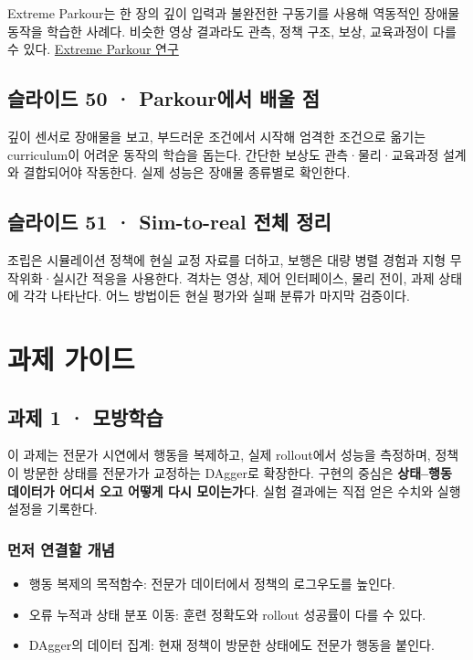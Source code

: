 \documentclass[11pt,a4paper]{article}
\begin{document}
Extreme Parkour는 한 장의 깊이 입력과 불완전한 구동기를 사용해 역동적인 장애물 동작을 학습한 사례다. 비슷한 영상 결과라도 관측, 정책 구조, 보상, 교육과정이 다를 수 있다. \href{https://arxiv.org/abs/2309.14341}{Extreme Parkour 연구}\par

\subsection{슬라이드 50 · Parkour에서 배울 점}

깊이 센서로 장애물을 보고, 부드러운 조건에서 시작해 엄격한 조건으로 옮기는 curriculum이 어려운 동작의 학습을 돕는다. 간단한 보상도 관측·물리·교육과정 설계와 결합되어야 작동한다. 실제 성능은 장애물 종류별로 확인한다.\par

\subsection{슬라이드 51 · Sim-to-real 전체 정리}

조립은 시뮬레이션 정책에 현실 교정 자료를 더하고, 보행은 대량 병렬 경험과 지형 무작위화·실시간 적응을 사용한다. 격차는 영상, 제어 인터페이스, 물리 전이, 과제 상태에 각각 나타난다. 어느 방법이든 현실 평가와 실패 분류가 마지막 검증이다.\par

\clearpage
\setlength{\parskip}{0.35em}
\section{과제 가이드}
\subsection{과제 1 · 모방학습}


이 과제는 전문가 시연에서 행동을 복제하고, 실제 rollout에서 성능을 측정하며, 정책이 방문한 상태를 전문가가 교정하는 DAgger로 확장한다. 구현의 중심은 \textbf{상태–행동 데이터가 어디서 오고 어떻게 다시 모이는가}다. 실험 결과에는 직접 얻은 수치와 실행 설정을 기록한다.\par

\subsubsection{먼저 연결할 개념}

\begin{itemize}
\item 행동 복제의 목적함수: 전문가 데이터에서 정책의 로그우도를 높인다.
\item 오류 누적과 상태 분포 이동: 훈련 정확도와 rollout 성공률이 다를 수 있다.
\item DAgger의 데이터 집계: 현재 정책이 방문한 상태에도 전문가 행동을 붙인다.
\end{itemize}
\end{document}
